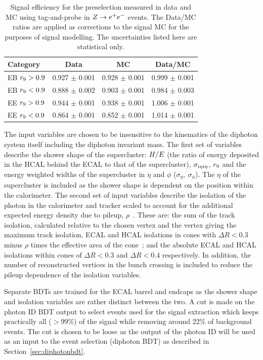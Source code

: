 \begin{table}
\begin{tabular}{| l | c | c | c |}
\hline
\textbf{Category} & \textbf{Data} & \textbf{MC} & \textbf{Data/MC} \\
\hline
EB $r_{9}>0.9$ & 0.927 $\pm$ 0.001 & 0.928 $\pm$ 0.001 &0.999 $\pm$ 0.001 \\
EB $r_{9}<0.9$ & 0.888 $\pm$ 0.002 & 0.903 $\pm$ 0.001 &0.984 $\pm$ 0.003 \\
EE $r_{9}>0.9$ & 0.944 $\pm$ 0.001 & 0.938 $\pm$ 0.001 &1.006 $\pm$ 0.001 \\
EE $r_{9}<0.9$ & 0.864 $\pm$ 0.001 & 0.852 $\pm$ 0.001 &1.014 $\pm$ 0.001 \\
\hline
\end{tabular}
\caption{Signal efficiency for the preselection measured in data and MC using tag-and-probe in
$Z\rightarrow e^{+}e^{-}$ events. The Data/MC ratios are applied as corrections to the signal MC for the purposes
of signal modelling. The uncertainties listed here are statistical only.}
\label{tab:sigeffpresel}
\end{table}

The input variables are chosen to be insensitive to the kinematics of the diphoton system itself
including the diphoton invariant mass. The first set of variables describe the shower shape of the 
supercluster: $H/E$ (the ratio of energy deposited in the HCAL behind the ECAL to that of the supercluster), 
$\sigma_{i\eta i\eta}$, $r_{9}$ and the energy weighted widths of the supercluster in
$\eta$ and $\phi$ ($\sigma_{\eta},~\sigma_{\phi}$). The $\eta$ of the supercluster is 
included as the shower shape is dependent on the position within the calorimeter. 
The second set of input variables describe the
isolation of the photon in the calorimeter and tracker scaled to account for 
the additional expected energy density due to pileup, $\rho$~\citep{2011JInst611002C}. 
These are: the sum of the track isolation, 
calculated relative to the chosen vertex and the vertex giving the maximum track isolation,
ECAL and HCAL isolations in cones with $\Delta R<0.3$ minus $\rho$ times the effective area 
of the cone~\citep{2011JInst611002C}; 
and the absolute ECAL and HCAL isolations within cones of $\Delta R <0.3$ and $\Delta R<0.4$ 
respectively. In addition, the number of reconstructed vertices in the bunch crossing is included
to reduce the pileup dependence of the isolation variables. 

Separate BDTs are trained for the ECAL barrel and endcaps as the shower
shape and isolation variables are rather distinct between the two. 
A cut is made on the photon ID BDT output to select events used for the signal extraction which
keeps practically all ($>99\%$) of the signal while removing around 22\% of background events.
The cut is chosen to be loose as the output of the photon ID will be used as an input to the 
event selection (diphoton BDT) as described in Section~\ref{sec:diphotonbdt}. 

